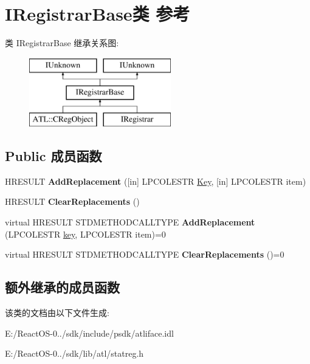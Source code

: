 \hypertarget{interface_i_registrar_base}{}\section{I\+Registrar\+Base类 参考}
\label{interface_i_registrar_base}
类 I\+Registrar\+Base 继承关系图\+:\begin{figure}[H]
\begin{center}
\leavevmode
\includegraphics[height=3.000000cm]{interface_i_registrar_base}
\end{center}
\end{figure}
\subsection*{Public 成员函数}
\begin{DoxyCompactItemize}
\item 
\mbox{\label{interface_i_registrar_base_a529cdc6cf6f233f99cfe363f61b6a010}} 
H\+R\+E\+S\+U\+LT {\bfseries Add\+Replacement} (\mbox{[}in\mbox{]} L\+P\+C\+O\+L\+E\+S\+TR \hyperlink{struct_key}{Key}, \mbox{[}in\mbox{]} L\+P\+C\+O\+L\+E\+S\+TR item)
\item 
\mbox{\label{interface_i_registrar_base_a712ff2ea1b7a058a29ddaf494967ecd5}} 
H\+R\+E\+S\+U\+LT {\bfseries Clear\+Replacements} ()
\item 
\mbox{\label{interface_i_registrar_base_a6cfacd82a2d11d9b5d561ee45d4c62d7}} 
virtual H\+R\+E\+S\+U\+LT S\+T\+D\+M\+E\+T\+H\+O\+D\+C\+A\+L\+L\+T\+Y\+PE {\bfseries Add\+Replacement} (L\+P\+C\+O\+L\+E\+S\+TR \hyperlink{structkey}{key}, L\+P\+C\+O\+L\+E\+S\+TR item)=0
\item 
\mbox{\label{interface_i_registrar_base_a5ec03358496df1439f32ec53116ac321}} 
virtual H\+R\+E\+S\+U\+LT S\+T\+D\+M\+E\+T\+H\+O\+D\+C\+A\+L\+L\+T\+Y\+PE {\bfseries Clear\+Replacements} ()=0
\end{DoxyCompactItemize}
\subsection*{额外继承的成员函数}


该类的文档由以下文件生成\+:\begin{DoxyCompactItemize}
\item 
E\+:/\+React\+O\+S-\/0../sdk/include/psdk/atliface.\+idl\item 
E\+:/\+React\+O\+S-\/0../sdk/lib/atl/statreg.\+h\end{DoxyCompactItemize}

